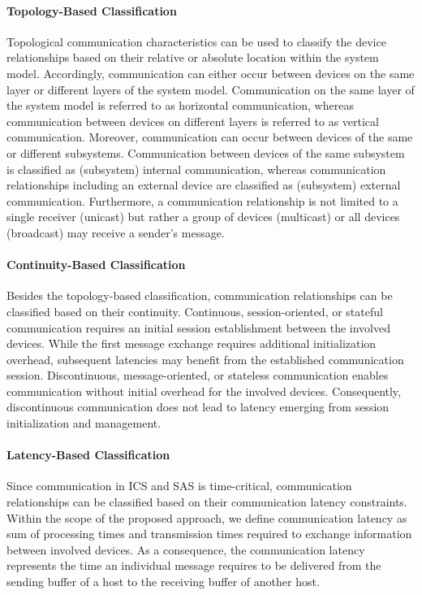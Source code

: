 \paragraph{Topology-Based Classification}
Topological communication characteristics can be used to classify the device relationships based on their relative or absolute location within the system model.
Accordingly, communication can either occur between devices on the same layer or different layers of the system model.
Communication on the same layer of the system model is referred to as horizontal communication, whereas communication between devices on different layers is referred to as vertical communication.
Moreover, communication can occur between devices of the same or different subsystems.
Communication between devices of the same subsystem is classified as (subsystem) internal communication, whereas communication relationships including an external device are classified as (subsystem) external communication.
Furthermore, a communication relationship is not limited to a single receiver (unicast) but rather a group of devices (multicast) or all devices (broadcast) may receive a sender's message.

\paragraph{Continuity-Based Classification}
Besides the topology-based classification, communication relationships can be classified based on their continuity.
Continuous, session-oriented, or stateful communication requires an initial session establishment between the involved devices.
While the first message exchange requires additional initialization overhead, subsequent latencies may benefit from the established communication session.
Discontinuous, message-oriented, or stateless communication enables communication without initial overhead for the involved devices.
Consequently, discontinuous communication does not lead to latency emerging from session initialization and management.

\paragraph{Latency-Based Classification}
Since communication in ICS and SAS is time-critical, communication relationships can be classified based on their communication latency constraints.
Within the scope of the proposed approach, we define communication latency as sum of processing times and transmission times required to exchange information between involved devices.
As a consequence, the communication latency represents the time an individual message requires to be delivered from the sending buffer of a host to the receiving buffer of another host.

